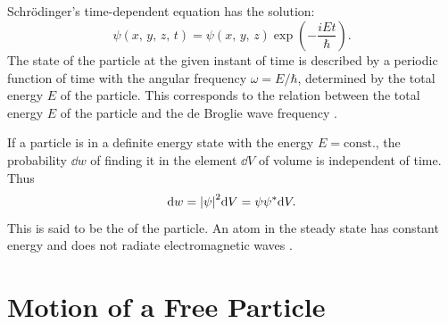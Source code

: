 \subsection{}\label{38.2.6} Schr\"odinger's time-dependent equation has the solution:
\begin{equation*}%
\psi (x,\, y,\, z,\, t ) = \psi (x,\, y,\, z) \exp \left( -\frac{iEt}{\hbar} \right).
\end{equation*}
The state of the particle at the given instant of time is described by a periodic function of time with the angular frequency $\omega = E/\hbar$, determined by the total energy $E$ of the particle. This corresponds to the relation between the total energy $E$ of the particle and the de Broglie wave frequency .

If a particle is in a definite energy state with the energy $E = \text{const.}$, the probability $\dd w$ of finding it in the element $\dd V$ of volume is independent of time. Thus
\begin{equation*}%
\dd w = \abs{\psi}^{2} \dd V = \psi \psi^{*} \dd V.
\end{equation*}
This is said to be the  of the particle. An atom in the steady state has constant energy and does not radiate electromagnetic waves .

\section{Motion of a Free Particle}
\label{sec-38.3} 

